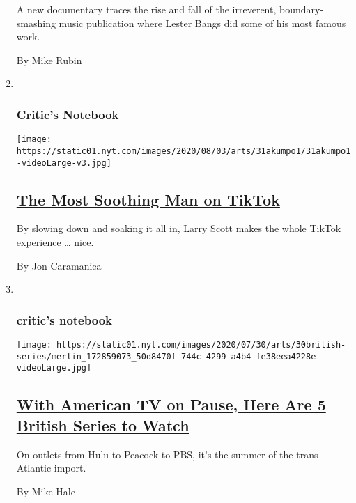 \begin{enumerate}
  A new documentary traces the rise and fall of the irreverent,
  boundary-smashing music publication where Lester Bangs did some of his
  most famous work.

  By Mike Rubin
\item ~
  \hypertarget{critics-notebook-1}{%
  \subsubsection{Critic's Notebook}\label{critics-notebook-1}}

  \texttt{[image: https://static01.nyt.com/images/2020/08/03/arts/31akumpo1/31akumpo1-videoLarge-v3.jpg]}

  \hypertarget{the-most-soothing-man-on-tiktok}{%
  \subsection{\texorpdfstring{\href{/2020/07/31/arts/larry-scott-tiktok-larryakumpo.html}{The
  Most Soothing Man on
  TikTok}}{The Most Soothing Man on TikTok}}\label{the-most-soothing-man-on-tiktok}}

  By slowing down and soaking it all in, Larry Scott makes the whole
  TikTok experience \ldots{} nice.

  By Jon Caramanica
\item ~
  \hypertarget{critics-notebook-2}{%
  \subsubsection{critic's notebook}\label{critics-notebook-2}}

  \texttt{[image: https://static01.nyt.com/images/2020/07/30/arts/30british-series/merlin\_172859073\_50d8470f-744c-4299-a4b4-fe38eea4228e-videoLarge.jpg]}

  \hypertarget{with-american-tv-on-pause-here-are-5-british-series-to-watch}{%
  \subsection{\texorpdfstring{\href{/2020/07/30/arts/television/in-my-skin-hulu.html}{With
  American TV on Pause, Here Are 5 British Series to
  Watch}}{With American TV on Pause, Here Are 5 British Series to Watch}}\label{with-american-tv-on-pause-here-are-5-british-series-to-watch}}

  On outlets from Hulu to Peacock to PBS, it's the summer of the
  trans-Atlantic import.

  By Mike Hale
\end{enumerate}

